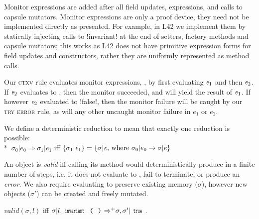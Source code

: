 
\noindent Monitor expressions are added after all field updates, \Q@new@ expressions, and calls to capsule mutators.
Monitor expressions are only a proof device, they need not be implemented directly as presented.
For example, in L42 we implement them by statically injecting calls to \Q!invariant! at the end of setters, factory methods and capsule mutators; this works as L42 does not have primitive expression forms for field updates and constructors, rather they are uniformly represented as method calls.

Our \textsc{ctxv} rule evaluates monitor expressions, , by first evaluating ${\mathit{e}}_1$ and then ${\mathit{e}}_2$. If ${\mathit{e}}_2$ evaluates to \Q@true@, then the monitor succeeded, and will yield the result of ${\mathit{e}}_1$. If however ${\mathit{e}}_2$ evaluated to \Q!false!, then the monitor failure will be caught by our \textsc{try error} rule, as will any other uncaught monitor failure in $e_1$ or $e_2$.

We define a deterministic reduction to mean that exactly one reduction is possible:\\*
\indent$\ \sigma_0|e_0\Rightarrow \sigma_1|e_1$ iff $\{\sigma_1|{\mathit{e}}_1\}=\{\sigma|{\mathit{e}} \text{, where } \sigma_0|e_0\rightarrow \sigma|e\}$

\noindent An object is \emph{valid} iff calling its \Q@invariant@ method would
deterministically produce \Q@true@ in a finite number of steps, i.e. it does not evaluate to \Q@false@, fail to terminate, or produce an \emph{error}.
We also require evaluating \Q@invariant@ to preserve existing memory ($\sigma$), however new objects ($\sigma'$) can be created and freely mutated.

\indent$\mathit{valid}(\sigma,l)$ iff $\sigma | l.\invariant {\Rightarrow^+} \sigma,\sigma' | \Kw{true}$.%

